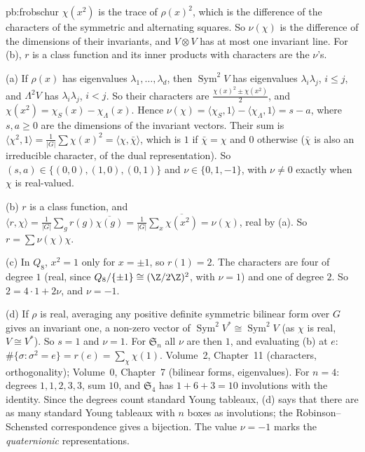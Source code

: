 \begin{solution}{pb:frobschur}
\idea $\chi(x^2)$ is the trace of $\rho(x)^2$, which is the difference of the characters of the symmetric and alternating squares.
So $\nu(\chi)$ is the difference of the dimensions of their invariants, and $V\otimes V$ has at most one invariant line. For (b),
$r$ is a class function and its inner products with characters are the $\nu$'s.

\writeup (a) If $\rho(x)$ has eigenvalues $\lambda_1,\dots,\lambda_d$, then $\operatorname{Sym}^2V$ has eigenvalues $\lambda_i\lambda_j$,
$i\le j$, and $\Lambda^2V$ has $\lambda_i\lambda_j$, $i<j$. So their characters are $\frac{\chi(x)^2\pm\chi(x^2)}2$, and
$\chi(x^2)=\chi_S(x)-\chi_\Lambda(x)$. Hence $\nu(\chi)=\langle\chi_S,1\rangle-\langle\chi_\Lambda,1\rangle=s-a$, where $s,a\ge0$ are the
dimensions of the invariant vectors. Their sum is $\langle\chi^2,1\rangle=\frac1{|G|}\sum\chi(x)^2=\langle\chi,\bar\chi\rangle$, which is
$1$ if $\bar\chi=\chi$ and $0$ otherwise ($\bar\chi$ is also an irreducible character, of the dual representation). So
$(s,a)\in\{(0,0),(1,0),(0,1)\}$ and $\nu\in\{0,1,-1\}$, with $\nu\ne0$ exactly when $\chi$ is real-valued.

(b) $r$ is a class function, and $\langle r,\chi\rangle=\frac1{|G|}\sum_gr(g)\overline{\chi(g)}=\frac1{|G|}\sum_x\overline{\chi(x^2)}=\nu(\chi)$,
real by (a). So $r=\sum\nu(\chi)\chi$.

(c) In $Q_8$, $x^2=1$ only for $x=\pm1$, so $r(1)=2$. The characters are four of degree $1$ (real, since $Q_8/\{\pm1\}\cong(\Z/2\Z)^2$, with
$\nu=1$) and one of degree $2$. So $2=4\cdot1+2\nu$, and $\nu=-1$.

(d) If $\rho$ is real, averaging any positive definite symmetric bilinear form over $G$ gives an invariant one, a non-zero vector
of $\operatorname{Sym}^2V^*\cong\operatorname{Sym}^2V$ (as $\chi$ is real, $V\cong V^*$). So $s=1$ and $\nu=1$. For $\mathfrak S_n$ all
$\nu$ are then $1$, and evaluating (b) at $e$: $\#\{\sigma:\sigma^2=e\}=r(e)=\sum_\chi\chi(1)$.
\tools Volume~2, Chapter~11 (characters, orthogonality); Volume~0, Chapter~7 (bilinear forms, eigenvalues).
\leads For $n=4$: degrees $1,1,2,3,3$, sum $10$, and $\mathfrak S_4$ has $1+6+3=10$ involutions with the identity. Since the degrees count
standard Young tableaux, (d) says that there are as many standard Young tableaux with $n$ boxes as involutions; the
Robinson--Schensted correspondence gives a bijection. The value $\nu=-1$ marks the \emph{quaternionic} representations.
\end{solution}

